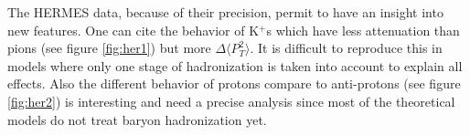 The HERMES data, because of their precision,
permit to have an insight into new features. One can cite the behavior of K$^+$s
which have less attenuation than pions (see figure \ref{fig:her1}) but more 
$\Delta \langle P_T^2 \rangle$. It is difficult to reproduce this in 
models where only one stage of hadronization is taken into account to 
explain all effects.
Also the different behavior of protons compare to anti-protons
(see figure \ref{fig:her2}) is interesting
and need a precise analysis since most of the theoretical models do not treat 
baryon hadronization yet.


